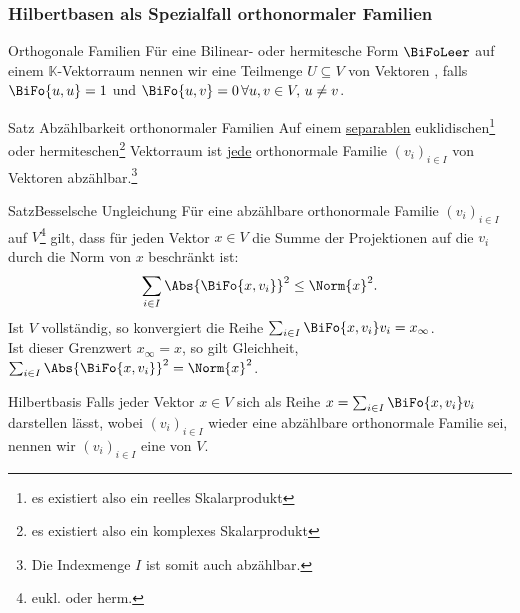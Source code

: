 \subsubsection{Hilbertbasen als Spezialfall orthonormaler Familien}
\begin{Def}
{Orthogonale Familien}
Für eine Bilinear- oder hermitesche Form $\BiFoLeer$ auf einem $\mathbb{K}$-Vektorraum nennen wir eine Teilmenge $U\subseteq V$ von Vektoren , falls $\BiFo{u,u}=1$ und $\BiFo{u,v}=0\,\forall u,v\in V,\,u\neq v$.
\end{Def}
\begin{Satz}{Satz}
{Abzählbarkeit orthonormaler Familien}
Auf einem \underline{separablen} euklidischen\footnote{es existiert also ein reelles Skalarprodukt} oder hermiteschen\footnote{es existiert also ein komplexes Skalarprodukt} Vektorraum ist \underline{jede} orthonormale Familie $(v_i)_{i\in I}$ von Vektoren abzählbar.\footnote{Die Indexmenge $I$ ist somit auch abzählbar.}
\end{Satz}

\begin{Satz}
{Satz}{Besselsche Ungleichung}
Für eine abzählbare orthonormale Familie $(v_i)_{i\in I}$ auf $V$\footnote{eukl. oder herm.} gilt, dass für jeden Vektor $x\in V$ die Summe der Projektionen auf die $v_i$ durch die Norm von $x$ beschränkt ist:
\begin{equation}
    \sum_{i\in I}\Abs{\BiFo{x,v_i}}^2\leq\Norm{x}^2.
\end{equation}
Ist $V$ vollständig, so konvergiert die Reihe $\sum_{i\in I}\BiFo{x,v_i}v_i=x_\infty$.\\
Ist dieser Grenzwert $x_\infty=x$, so gilt Gleichheit, $\sum_{i\in I}\Abs{\BiFo{x,v_i}}^2=\Norm{x}^2$.
\end{Satz}
\begin{Def}
{Hilbertbasis}
Falls jeder Vektor $x\in V$ sich als Reihe $x=\sum_{i\in I}\BiFo{x,v_i}v_i$ darstellen lässt, wobei $(v_i)_{i\in I}$ wieder eine abzählbare orthonormale Familie sei, nennen wir $(v_i)_{i\in I}$ eine  von $V$.
\end{Def}

